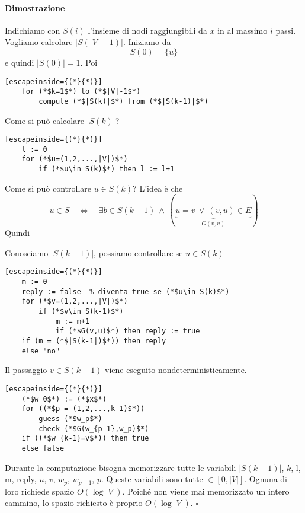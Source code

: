 \paragraph{Dimostrazione} Indichiamo con $S(i)$ l'insieme di nodi raggiungibili da $x$ in al massimo $i$ passi. Vogliamo calcolare $|S(|V|-1)|$. Iniziamo da
$$
    S(0) = \{u\}
$$
e quindi $|S(0)|=1$. Poi
\begin{lstlisting}[escapeinside={(*}{*)}]
    for (*$k=1$*) to (*$|V|-1$*)
        compute (*$|S(k)|$*) from (*$|S(k-1)|$*)
\end{lstlisting}
Come si può calcolare $|S(k)|$? 
\begin{lstlisting}[escapeinside={(*}{*)}]
    l := 0
    for (*$u=(1,2,...,|V|)$*)
        if (*$u\in S(k)$*) then l := l+1
\end{lstlisting}
Come si può controllare $u\in S(k)$? L'idea è che 
$$
u\in S
\quad\Leftrightarrow\quad
\exists b\in S(k-1) ~\land~ (\underbrace{u=v ~\lor~ (v,u)\in E}_{G(v,u)})
$$
Quindi
\begin{center}
\end{center}
Conosciamo $|S(k-1)|$, possiamo controllare se $u\in S(k)$
\begin{lstlisting}[escapeinside={(*}{*)}]
    m := 0
    reply := false  % diventa true se (*$u\in S(k)$*)
    for (*$v=(1,2,...,|V|)$*)
        if (*$v\in S(k-1)$*)
            m := m+1
            if (*$G(v,u)$*) then reply := true
    if (m = (*$|S(k-1|)$*)) then reply 
    else "no"
\end{lstlisting}
Il passaggio $v\in S(k-1)$ viene eseguito nondeterministicamente.
\begin{lstlisting}[escapeinside={(*}{*)}]
    (*$w_0$*) := (*$x$*)
    for ((*$p = (1,2,...,k-1)$*))
        guess (*$w_p$*)
        check (*$G(w_{p-1},w_p)$*)
    if ((*$w_{k-1}=v$*)) then true 
    else false
\end{lstlisting}
Durante la computazione bisogna memorizzare tutte le variabili $|S(k-1)|$, $k$, l, m, reply, $u$, $v$, $w_p$, $w_{p-1}$, $p$. Queste variabili sono tutte $\in[0,|V|]$. Ognuna di loro richiede spazio $O(\log|V|)$. Poiché non viene mai memorizzato un intero cammino, lo spazio richiesto è proprio $O(\log|V|)$. \hfill$\square$

